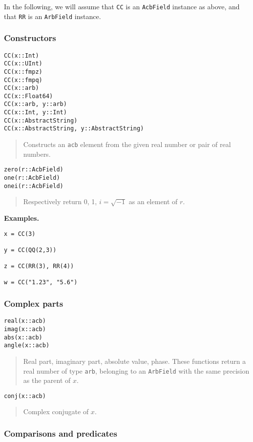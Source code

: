 \documentclass[a4paper,10pt]{article}
\newcommand{\code}{\lstinline}
\newcommand{\desc}[1]{\vspace{-3mm}\begin{quote}#1\end{quote}}
\begin{document}
{{In the following, we will assume that \code{CC} is an \code{AcbField}
instance as above, and that \code{RR} is an \code{ArbField} instance.



\subsubsection{Constructors}

\begin{lstlisting}
CC(x::Int)
CC(x::UInt)
CC(x::fmpz)
CC(x::fmpq)
CC(x::arb)
CC(x::Float64)
CC(x::arb, y::arb)
CC(x::Int, y::Int)
CC(x::AbstractString)
CC(x::AbstractString, y::AbstractString)
\end{lstlisting}

\desc{Constructs an \code{acb} element from the given real number or
pair of real numbers.}

\begin{lstlisting}
zero(r::AcbField)
one(r::AcbField)
onei(r::AcbField)
\end{lstlisting}

\desc{Respectively return 0, 1, $i = \sqrt{-1}$ as an element of $r$.}

\textbf{Examples.}

\begin{lstlisting}
x = CC(3)

y = CC(QQ(2,3))

z = CC(RR(3), RR(4))

w = CC("1.23", "5.6")
\end{lstlisting}

\subsubsection{Complex parts}

\begin{lstlisting}
real(x::acb)
imag(x::acb)
abs(x::acb)
angle(x::acb)
\end{lstlisting}

\desc{Real part, imaginary part, absolute value, phase. These functions
return a real number of type \code{arb}, belonging to an \code{ArbField}
with the same precision as the parent of $x$.}

\begin{lstlisting}
conj(x::acb)
\end{lstlisting}

\desc{Complex conjugate of $x$.}

\subsubsection{Comparisons and predicates}

}}
\end{document}
